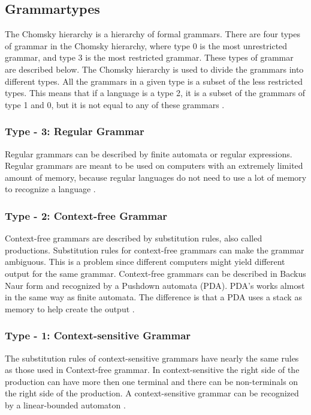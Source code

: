 \subsection{Grammartypes}
The Chomsky hierarchy is a hierarchy of formal grammars. There are four types of grammar in the Chomsky hierarchy, where type 0 is the most unrestricted grammar, and type 3 is the most restricted grammar. These types of grammar are described below. The Chomsky hierarchy is used to divide the grammars into different types. All the grammars in a given type is a subset of the less restricted types. This means that if a language is a type 2, it is a subset of the grammars of type 1 and 0, but it is not equal to any of these grammars \citep{Chomsky}.

\subsubsection{Type - 3: Regular Grammar}
Regular grammars can be described by finite automata or regular expressions. Regular grammars are meant to be used on computers with an extremely limited amount of memory, because regular languages do not need to use a lot of memory to recognize a language \citep{sipser}.

\subsubsection{Type - 2: Context-free Grammar}
Context-free grammars are described by substitution rules, also called productions. Substitution rules for context-free grammars can make the grammar ambiguous.
This is a problem since different computers might yield different output for the same grammar.
Context-free grammars can be described in Backus Naur form and recognized by a Pushdown automata (PDA). PDA's works almost in the same way as finite automata. The difference is that a PDA uses a stack as memory to help create the output \citep{sipser}. 

\subsubsection{Type - 1: Context-sensitive Grammar}
The substitution rules of context-sensitive grammars  have nearly the same rules as those used in Context-free grammar. In context-sensitive the right side of the production can have more then one terminal and there can be non-terminals on the right side of the production. A context-sensitive grammar can be recognized by a linear-bounded automaton \citep{ItLatToC}.

